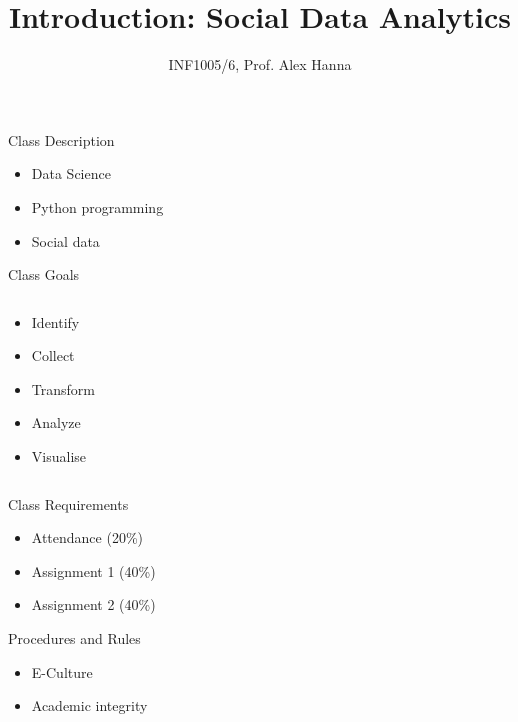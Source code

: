 \documentclass{beamer}
\title[Introduction: Social Data Analytics]
{Introduction: Social Data Analytics}
\author{INF1005/6, Prof. Alex Hanna}
\institute[] {
}
\begin{document}
\begin{frame}
  \titlepage
\end{frame}

\begin{frame}{Class Description}
    \begin{itemize}
        \item Data Science
        \item Python programming
        \item Social data
    \end{itemize}
\end{frame}

\begin{frame}{Class Goals}
  \begin{columns}
    \begin{column}{0.5\textwidth}
      \begin{itemize}[<+->]
        \item Identify
        \item Collect
        \item Transform
        \item Analyze
        \item Visualise
      \end{itemize}
    \end{column}
    \begin{column}{0.5\textwidth}
    \end{column}
  \end{columns}
\end{frame}

\begin{frame}{Class Requirements}
  \begin{center}
      \begin{itemize}[<+->]
        \item Attendance (20\%)
        \item Assignment 1 (40\%)
        \item Assignment 2 (40\%)
      \end{itemize}
  \end{center}
\end{frame}

\begin{frame}{Procedures and Rules}
    \begin{itemize}[<+->]
        \item E-Culture 
        \item Academic integrity
    \end{itemize}
\end{frame}
\end{document}
